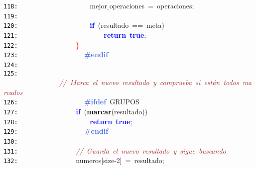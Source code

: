 \documentclass[a4paper,10pt]{scrartcl}
\begin{document}
{   \mbox{}\texttt{\textcolor{Black}{118:}} \ \ \ \ \ \ \ \ \ \ \ \ \ \ \ \ \ \ \ \ mejor$\_$operaciones\ \textcolor{BrickRed}{=}\ operaciones\textcolor{BrickRed}{;} \\
   \mbox{}\texttt{\textcolor{Black}{119:}} \ \ \ \ \ \ \ \ \ \  \\
   \mbox{}\texttt{\textcolor{Black}{120:}} \ \ \ \ \ \ \ \ \ \ \ \ \ \ \ \ \ \ \ \ \textbf{\textcolor{Blue}{if}}\ \textcolor{BrickRed}{(}resultado\ \textcolor{BrickRed}{==}\ meta\textcolor{BrickRed}{)} \\
   \mbox{}\texttt{\textcolor{Black}{121:}} \ \ \ \ \ \ \ \ \ \ \ \ \ \ \ \ \ \ \ \ \ \ \ \ \textbf{\textcolor{Blue}{return}}\ \textbf{\textcolor{Blue}{true}}\textcolor{BrickRed}{;} \\
   \mbox{}\texttt{\textcolor{Black}{122:}} \ \ \ \ \ \ \ \ \ \ \ \ \ \ \ \ \textcolor{Red}{\}} \\
   \mbox{}\texttt{\textcolor{Black}{123:}} \textbf{\textcolor{RoyalBlue}{\ \ \ \ \ \ \ \ \ \ \ \ \ \ \ \ \#endif}} \\
   \mbox{}\texttt{\textcolor{Black}{124:}} \ \ \ \ \ \ \ \  \\
   \mbox{}\texttt{\textcolor{Black}{125:}} \ \ \ \ \ \ \ \ \ \ \ \ \ \ \ \ \textit{\textcolor{Brown}{//\ Marca\ el\ nuevo\ resultado\ y\ comprueba\ si\ están\ todos\ marcados}} \\
   \mbox{}\texttt{\textcolor{Black}{126:}} \textbf{\textcolor{RoyalBlue}{\ \ \ \ \ \ \ \ \ \ \ \ \ \ \ \ \#ifdef}}\ GRUPOS \\
   \mbox{}\texttt{\textcolor{Black}{127:}} \ \ \ \ \ \ \ \ \ \ \ \ \ \ \ \ \textbf{\textcolor{Blue}{if}}\ \textcolor{BrickRed}{(}\textbf{\textcolor{Black}{marcar}}\textcolor{BrickRed}{(}resultado\textcolor{BrickRed}{))} \\
   \mbox{}\texttt{\textcolor{Black}{128:}} \ \ \ \ \ \ \ \ \ \ \ \ \ \ \ \ \ \ \ \ \textbf{\textcolor{Blue}{return}}\ \textbf{\textcolor{Blue}{true}}\textcolor{BrickRed}{;} \\
   \mbox{}\texttt{\textcolor{Black}{129:}} \textbf{\textcolor{RoyalBlue}{\ \ \ \ \ \ \ \ \ \ \ \ \ \ \ \ \#endif}} \\
   \mbox{}\texttt{\textcolor{Black}{130:}} \ \ \ \ \ \ \ \ \ \ \ \ \ \  \\
   \mbox{}\texttt{\textcolor{Black}{131:}} \ \ \ \ \ \ \ \ \ \ \ \ \ \ \ \ \textit{\textcolor{Brown}{//\ Guarda\ el\ nuevo\ resultado\ y\ sigue\ buscando}} \\
   \mbox{}\texttt{\textcolor{Black}{132:}} \ \ \ \ \ \ \ \ \ \ \ \ \ \ \ \ numeros\textcolor{BrickRed}{[}size\textcolor{BrickRed}{-}\textcolor{Purple}{2}\textcolor{BrickRed}{]}\ \textcolor{BrickRed}{=}\ resultado\textcolor{BrickRed}{;} \\
}
\end{document}
